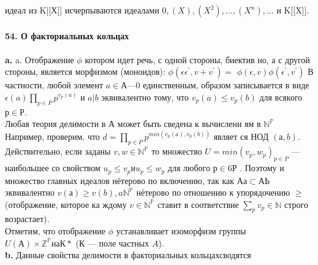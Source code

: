 \documentclass{../../template/mai_book}
\begin{document}
{{идеал из K[[Х]] исчерпываются идеалами ${0}, (X), (X^{2}),\ldots, (X^{n} ), \ldots$ и\linebreak
K[[X]].\\
\\
\noindent\textbf{54. О факториальных кольцах}\\
\\
\hspace*{15pt}\textbf{a.} a. Отображение $\phi$ котором идет речь, с одной стороны, биектив­\linebreak
но, а с другой стороны, является морфизмом (моноидов): $\phi(\epsilon\epsilon^{'},v + v^{'}) =$\linebreak
$\phi(\epsilon,v)\phi(\epsilon^{'}, v^{'})$ В частности, любой элемент $a \in А — {0}$ единственным,\linebreak
образом записывается в виде $\epsilon(a) \prod_{p\in P}p^{v_{p}(a)}$ и $a | b$ эквивалентно тому,\linebreak
что $v_p(a) \leq v_{p}(b)$ для всякого $р \in Р$.\\
\hspace*{0pt}Любая теория делимости в А может быть сведена к вычислени­\linebreak
ям в $\mathbb{N^{P}}$ Например, проверим, что $d = \prod_{p \in P} p^{min(v_{p}(a),v_{p}(b))}$ являет­\linebreak
ся НОД $(а, b)$. Действительно, если заданы $v, w \in \mathbb{N^{P}}$ то множество \linebreak
$U = min(v_p, w_p)_{p \in P}$ --- наибольшее со свойством $u_p \leq v_p и u_p \leq w_p$\linebreak
для любого $р \in6 Р$ . Поэтому и множество главных идеалов нётерово \linebreak
по включению, так как $Аа \subset АЬ$ эквивалентно $v(а) \geq v(b), a \mathbb{N^{P}}$\linebreak
нётерово по отношению к упорядочению $\geq$ (отображение, которое ка­\linebreak
ждому $v \in \mathbb{N^{P}}$ ставит в соответствие $\sum_{p}v_p \in \mathbb{N}$ строго возрастает).\\
\hspace*{0pt} Отметим, что отображение $\phi$ устанавливает изоморфизм группы\linebreak
$U(А) \times \mathbb{Z^{P}} на К*$ ($К$ — поле частных $A$).\\
\hspace*{15pt}\textbf{b.} Данные свойства делимости в факториальных кольцах\linebreak сводятся
}}
\end{document}
